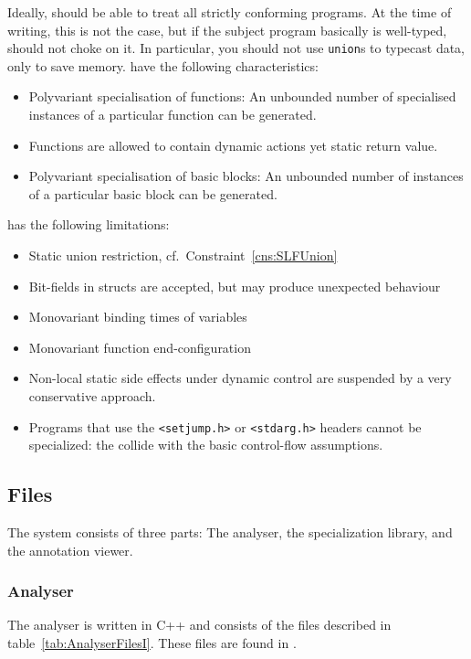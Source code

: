 \begin{docpart}
Ideally, \cmix should be able to treat all strictly conforming \ansiC
programs. At the time of writing, this is not the case, but if the
subject program basically is well-typed, \cmix should not choke on it.
In particular, you should not use \verb|union|s to typecast data, only
to save memory. \cmix have the following characteristics:

\begin{itemize}
\item Polyvariant specialisation of functions: An unbounded number of
  specialised instances of a particular function can be generated.
\item Functions are allowed to contain dynamic actions yet static return value.
\item Polyvariant specialisation of basic blocks: An unbounded number of
  instances of a particular basic block can be generated.
\end{itemize}

\noindent \cmix has the following limitations:
\begin{itemize}
\item Static union restriction, cf.\ Constraint~\vref{cns:SLFUnion}
\item Bit-fields in structs are accepted, but may produce unexpected
  behaviour
\item Monovariant binding times of variables
\item Monovariant function end-configuration
\item Non-local static side effects under dynamic control are
  suspended by a very conservative approach.
\item Programs that use the \texttt{<setjump.h>} or \texttt{<stdarg.h>}
  headers cannot be specialized: the collide with the basic control-flow
  assumptions.
\end{itemize}



\subsection{Files}
\label{sec:Files}

The \cmix system consists of three parts: The analyser, the
specialization library, and the annotation viewer.

\subsubsection{Analyser}
The analyser is written in C{++} and consists of the files described
in table~\ref{tab:AnalyserFilesI}. These files are found in
.


\end{docpart}
